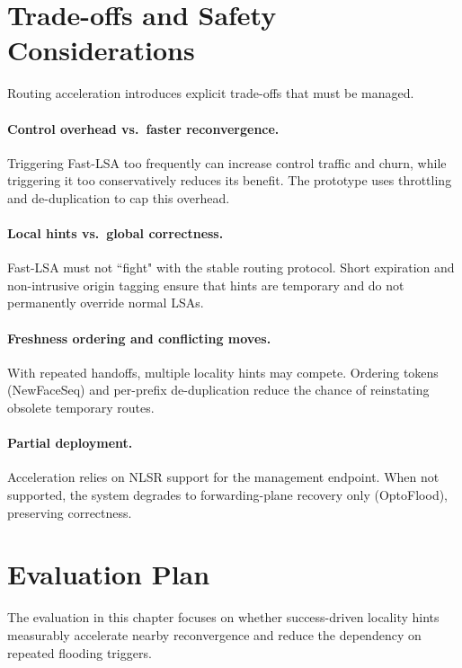 \section{Trade-offs and Safety Considerations}
\label{sec:routingacc:tradeoffs}

Routing acceleration introduces explicit trade-offs that must be managed.

\paragraph{Control overhead vs.\ faster reconvergence.}
Triggering Fast-LSA too frequently can increase control traffic and churn, while triggering it too conservatively reduces its benefit. The prototype uses throttling and de-duplication to cap this overhead.

\paragraph{Local hints vs.\ global correctness.}
Fast-LSA must not “fight" with the stable routing protocol. Short expiration and non-intrusive origin tagging ensure that hints are temporary and do not permanently override normal LSAs.

\paragraph{Freshness ordering and conflicting moves.}
With repeated handoffs, multiple locality hints may compete. Ordering tokens (NewFaceSeq) and per-prefix de-duplication reduce the chance of reinstating obsolete temporary routes.

\paragraph{Partial deployment.}
Acceleration relies on NLSR support for the management endpoint. When not supported, the system degrades to forwarding-plane recovery only (OptoFlood), preserving correctness.

\section{Evaluation Plan}
\label{sec:routingacc:evalplan}

The evaluation in this chapter focuses on whether success-driven locality hints measurably accelerate nearby reconvergence and reduce the dependency on repeated flooding triggers.

